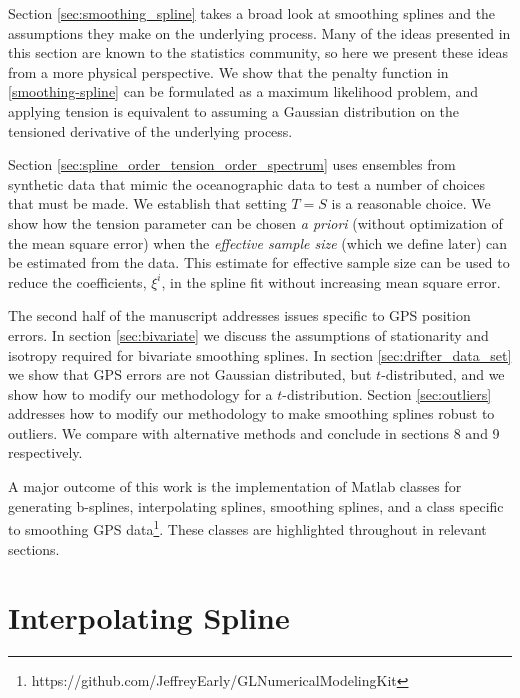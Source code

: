\documentclass{ametsoc}
\begin{document}
Section \ref{sec:smoothing_spline} takes a broad look at smoothing splines and the assumptions they make on the underlying process. Many of the ideas presented in this section are known to the statistics community, so here we present these ideas from a more physical perspective. %
We show that the penalty function in \eqref{smoothing-spline} can be formulated as a maximum likelihood problem, and applying tension is equivalent to assuming a Gaussian distribution on the tensioned derivative of the underlying process.

Section \ref{sec:spline_order_tension_order_spectrum} uses ensembles from synthetic data that mimic the oceanographic data to test a number of choices that must be made. We establish that setting $T=S$ is a reasonable choice. We show how the tension parameter can be chosen \emph{a priori} (without optimization of the mean square error) when the {\em effective sample size} (which we define later) can be estimated from the data. This estimate for effective sample size can be used to reduce the coefficients, $\xi^i$, in the spline fit without increasing mean square error. %

The second half of the manuscript addresses issues specific to GPS position errors. In section \ref{sec:bivariate} we discuss the assumptions of stationarity and isotropy required for bivariate smoothing splines. In section \ref{sec:drifter_data_set} we show that GPS errors are not Gaussian distributed, but $t$-distributed, and we show how to modify our methodology for a $t$-distribution. Section \ref{sec:outliers} addresses how to modify our methodology to make smoothing splines robust to outliers. We compare with alternative methods and conclude in sections 8 and 9 respectively.

A major outcome of this work is the implementation of Matlab classes for generating b-splines, interpolating splines, smoothing splines, and a class specific to smoothing GPS data\footnote{https://github.com/JeffreyEarly/GLNumericalModelingKit}. These classes are highlighted throughout in relevant sections.

%
\section{Interpolating Spline}
\label{sec:interpolation}
%
\end{document}

